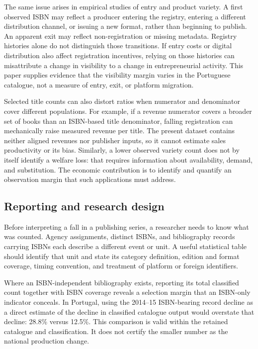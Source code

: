 \documentclass[11pt]{article}
\begin{document}
The same issue arises in empirical studies of entry and product variety. A first observed ISBN may reflect a producer entering the registry, entering a different distribution channel, or issuing a new format, rather than beginning to publish. An apparent exit may reflect non-registration or missing metadata. Registry histories alone do not distinguish those transitions. If entry costs or digital distribution also affect registration incentives, relying on those histories can misattribute a change in visibility to a change in entrepreneurial activity. This paper supplies evidence that the visibility margin varies in the Portuguese catalogue, not a measure of entry, exit, or platform migration.

Selected title counts can also distort ratios when numerator and denominator cover different populations. For example, if a revenue numerator covers a broader set of books than an ISBN-based title denominator, falling registration can mechanically raise measured revenue per title. The present dataset contains neither aligned revenues nor publisher inputs, so it cannot estimate sales productivity or its bias. Similarly, a lower observed variety count does not by itself identify a welfare loss: that requires information about availability, demand, and substitution. The economic contribution is to identify and quantify an observation margin that such applications must address.

\subsection{Reporting and research design}

Before interpreting a fall in a publishing series, a researcher needs to know what was counted. Agency assignments, distinct ISBNs, and bibliography records carrying ISBNs each describe a different event or unit. A useful statistical table should identify that unit and state its category definition, edition and format coverage, timing convention, and treatment of platform or foreign identifiers.

Where an ISBN-independent bibliography exists, reporting its total classified count together with ISBN coverage reveals a selection margin that an ISBN-only indicator conceals. In Portugal, using the 2014--15 ISBN-bearing record decline as a direct estimate of the decline in classified catalogue output would overstate that decline: 28.8\% versus 12.5\%. This comparison is valid within the retained catalogue and classification. It does not certify the smaller number as the national production change.
\end{document}
